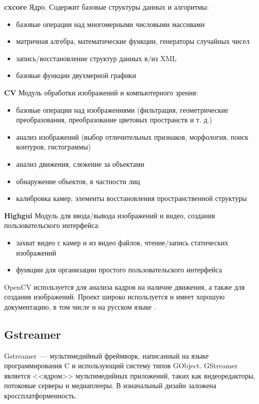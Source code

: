 \textbf{cxcore}
\smallskip
Ядро. Содержит базовые структуры данных и алгоритмы:
\smallskip
\begin{itemize}
	\item базовые операции над многомерными числовыми массивами
	\item матричная алгебра, математические функции, генераторы случайных чисел
	\item запись/восстановление структур данных в/из XML
	\item базовые функции двухмерной графики
\end{itemize}

\medskip
\textbf{CV}
\smallskip
Модуль обработки изображений и компьютерного зрения:
\smallskip
\begin{itemize}
	\item
	базовые операции над изображениями (фильтрация, геометрические преобразования,
	преобразование цветовых пространств и т. д.)
	\item
	анализ изображений (выбор отличительных признаков, морфология, поиск контуров, гистограммы)
	\item
	анализ движения, слежение за объектами
	\item
	обнаружение объектов, в частности лиц
	\item
	калибровка камер, элементы восстановления пространственной структуры
\end{itemize}

\medskip
\textbf{Highgui}
Модуль для ввода/вывода изображений и видео, создания пользовательского интерфейса:
\smallskip
\begin{itemize}
	\item захват видео с камер и из видео файлов, чтение/запись статических изображений
	\item функции для организации простого пользовательского интерфейса
\end{itemize}

\medskip
OpenCV используется для анализа кадров на наличие движения, а также для создания изображений.
Проект широко используется и имеет хорошую документацию, в том числе и на русском языке
\cite{opencv_doc}.

\subsection{Gstreamer}
Gstreamer~--- мультимедийный фреймворк, написанный на языке программирования C и
использующий систему типов GObject. GStreamer является <<ядром>> мультимедийных приложений,
таких как видеоредакторы, потоковые серверы и медиаплееры. В изначальный дизайн заложена
кроссплатформенность.

